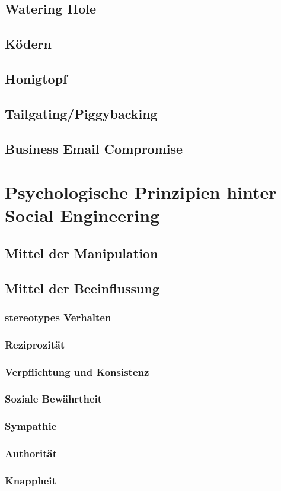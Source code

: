 \subsection{Watering Hole}
\subsection{Ködern}
\subsection{Honigtopf}
\subsection{Tailgating/Piggybacking}
\subsection{Business Email Compromise}

\section{Psychologische Prinzipien hinter Social Engineering}

\subsection{Mittel der Manipulation}

\subsection{Mittel der Beeinflussung}

\subsubsection{stereotypes Verhalten}
\subsubsection{Reziprozität}
\subsubsection{Verpflichtung und Konsistenz}
\subsubsection{Soziale Bewährtheit}
\subsubsection{Sympathie}
\subsubsection{Authorität}
\subsubsection{Knappheit}

